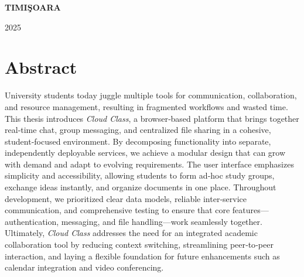 \documentclass[12pt,a4paper]{book}
\theoremstyle{definition}
\theoremstyle{remark}
\begin{document}
\vfill
\begin{center}
{\bf TIMI\c SOARA

2025}
\end{center}


\newpage
\normalsize{}



\section*{Abstract} 
  University students today juggle multiple tools for communication, collaboration, and resource management, resulting in fragmented workflows and wasted time.  This thesis introduces \emph{Cloud Class}, a browser‐based platform that brings together real‐time chat, group messaging, and centralized file sharing in a cohesive, student‐focused environment.  By decomposing functionality into separate, independently deployable services, we achieve a modular design that can grow with demand and adapt to evolving requirements.  The user interface emphasizes simplicity and accessibility, allowing students to form ad‐hoc study groups, exchange ideas instantly, and organize documents in one place.  Throughout development, we prioritized clear data models, reliable inter‐service communication, and comprehensive testing to ensure that core features—authentication, messaging, and file handling—work seamlessly together.  Ultimately, \emph{Cloud Class} addresses the need for an integrated academic collaboration tool by reducing context switching, streamlining peer‐to‐peer interaction, and laying a flexible foundation for future enhancements such as calendar integration and video conferencing.


\newpage
\normalsize{}

\tableofcontents








\end{document}
